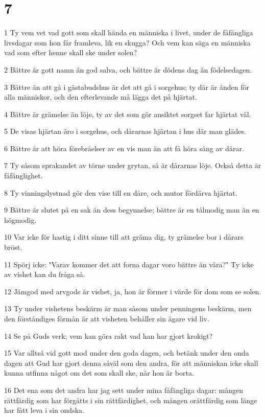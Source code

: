 \chapter{7}

\par 1 Ty vem vet vad gott som skall hända en människa i livet, under de fåfängliga livsdagar som hon får framleva, lik en skugga? Och vem kan säga en människa vad som efter henne skall ske under solen?
\par 2 Bättre är gott namn än god salva, och bättre är dödens dag än födelsedagen.
\par 3 Bättre än att gå i gästabudshus är det att gå i sorgehus; ty där är änden för alla människor, och den efterlevande må lägga det på hjärtat.
\par 4 Bättre är grämelse än löje, ty av det som gör ansiktet sorgset far hjärtat väl.
\par 5 De visas hjärtan äro i sorgehus, och dårarnas hjärtan i hus där man glädes.
\par 6 Bättre är att höra förebråelser av en vis man än att få höra sång av dårar.
\par 7 Ty såsom sprakandet av törne under grytan, så är dårarnas löje. Också detta är fåfänglighet.
\par 8 Ty vinningslystnad gör den vise till en dåre, och mutor fördärva hjärtat.
\par 9 Bättre är slutet på en sak än dess begynnelse; bättre är en tålmodig man än en högmodig.
\par 10 Var icke för hastig i ditt sinne till att gräma dig, ty grämelse bor i dårars bröst.
\par 11 Spörj icke: "Varav kommer det att forna dagar voro bättre än våra?" Ty icke av vishet kan du fråga så.
\par 12 Jämgod med arvgods är vishet, ja, hon är förmer i värde för dom som se solen.
\par 13 Ty under vishetens beskärm är man såsom under penningens beskärm, men den förståndiges förmån är att visheten behåller sin ägare vid liv.
\par 14 Se på Guds verk; vem kan göra rakt vad han har gjort krokigt?
\par 15 Var alltså vid gott mod under den goda dagen, och betänk under den onda dagen att Gud har gjort denna såväl som den andra, för att människan icke skall kunna utfinna något om det som skall ske, när hon är borta.
\par 16 Det ena som det andra har jag sett under mina fåfängliga dagar: mången rättfärdig som har förgåtts i sin rättfärdighet, och mången orättfärdig som länge har fått leva i sin ondska.
